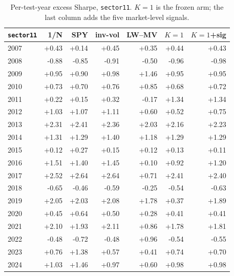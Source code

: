 \begin{table}[t]
  \centering
  \small
  \begin{tabular}{l rrrrrr}
    \hline
    \texttt{sector11} & 1/N & SPY & inv-vol & LW--MV & $K{=}1$ & $K{=}1$+sig \\
    \hline
    2007 & +0.43 & +0.14 & +0.45 & +0.35 & +0.44 & +0.43 \\
    2008 & -0.88 & -0.85 & -0.91 & -0.50 & -0.96 & -0.98 \\
    2009 & +0.95 & +0.90 & +0.98 & +1.46 & +0.95 & +0.95 \\
    2010 & +0.73 & +0.70 & +0.76 & +0.85 & +0.68 & +0.72 \\
    2011 & +0.22 & +0.15 & +0.32 & -0.17 & +1.34 & +1.34 \\
    2012 & +1.03 & +1.07 & +1.11 & +0.60 & +0.52 & +0.75 \\
    2013 & +2.31 & +2.41 & +2.36 & +2.03 & +2.16 & +2.23 \\
    2014 & +1.31 & +1.29 & +1.40 & +1.18 & +1.29 & +1.29 \\
    2015 & +0.12 & +0.27 & +0.15 & +0.12 & +0.13 & +0.11 \\
    2016 & +1.51 & +1.40 & +1.45 & +0.10 & +0.92 & +1.20 \\
    2017 & +2.52 & +2.64 & +2.64 & +0.71 & +2.41 & +2.40 \\
    2018 & -0.65 & -0.46 & -0.59 & -0.25 & -0.54 & -0.63 \\
    2019 & +2.05 & +2.03 & +2.08 & +1.78 & +0.37 & +1.89 \\
    2020 & +0.45 & +0.64 & +0.50 & +0.28 & +0.41 & +0.41 \\
    2021 & +2.10 & +1.93 & +2.11 & +0.86 & +1.78 & +1.81 \\
    2022 & -0.48 & -0.72 & -0.48 & +0.96 & -0.54 & -0.55 \\
    2023 & +0.76 & +1.38 & +0.57 & +0.41 & +0.74 & +0.70 \\
    2024 & +1.03 & +1.46 & +0.97 & +0.60 & +0.98 & +0.98 \\
    \hline
  \end{tabular}
  \caption[Per-year Sharpe, \texttt{sector11}]{Per-test-year excess Sharpe,
  \texttt{sector11}. $K{=}1$ is the frozen arm; the last column adds the five
  market-level signals.}
  \label{tab:app-peryear-s11}
\end{table}

